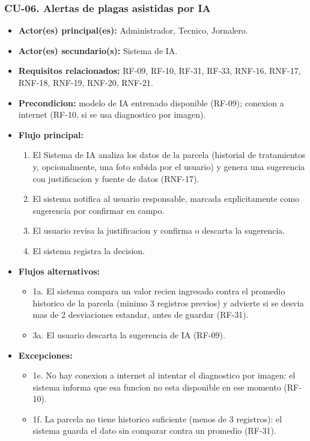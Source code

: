 \documentclass[11pt,a4paper]{article}
\begin{document}
\subsubsection{CU-06. Alertas de plagas asistidas por IA}
\begin{itemize}
\item \textbf{Actor(es) principal(es):} Administrador, Tecnico, Jornalero.
\item \textbf{Actor(es) secundario(s):} Sistema de IA.
\item \textbf{Requisitos relacionados:} RF-09, RF-10, RF-31, RF-33, RNF-16, RNF-17, RNF-18, RNF-19, RNF-20, RNF-21.
\item \textbf{Precondicion:} modelo de IA entrenado disponible (RF-09); conexion a internet (RF-10, si se usa diagnostico por imagen).
\item \textbf{Flujo principal:}
  \begin{enumerate}
  \item El Sistema de IA analiza los datos de la parcela (historial de tratamientos y, opcionalmente, una foto subida por el usuario) y genera una sugerencia con justificacion y fuente de datos (RNF-17).
  \item El sistema notifica al usuario responsable, marcada explicitamente como sugerencia por confirmar en campo.
  \item El usuario revisa la justificacion y confirma o descarta la sugerencia.
  \item El sistema registra la decision.
  \end{enumerate}
\item \textbf{Flujos alternativos:}
  \begin{itemize}
  \item 1a. El sistema compara un valor recien ingresado contra el promedio historico de la parcela (minimo 3 registros previos) y advierte si se desvia mas de 2 desviaciones estandar, antes de guardar (RF-31).
  \item 3a. El usuario descarta la sugerencia de IA (RF-09).
  \end{itemize}
\item \textbf{Excepciones:}
  \begin{itemize}
  \item 1e. No hay conexion a internet al intentar el diagnostico por imagen: el sistema informa que esa funcion no esta disponible en ese momento (RF-10).
  \item 1f. La parcela no tiene historico suficiente (menos de 3 registros): el sistema guarda el dato sin comparar contra un promedio (RF-31).

\end{itemize}
\end{itemize}
\end{document}

